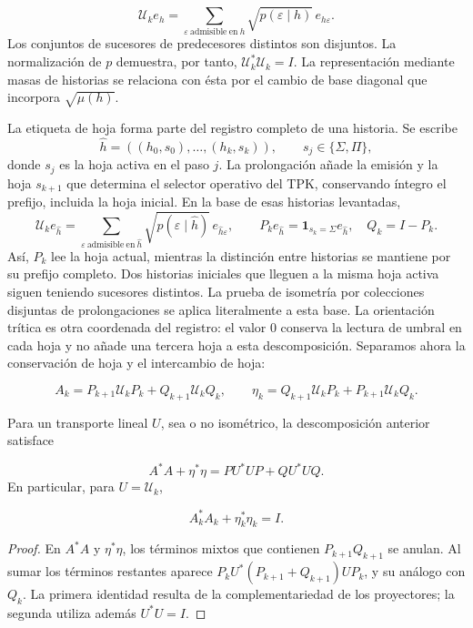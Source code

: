 \[
\mathcal U_ke_h=
\sum_{\varepsilon\ \mathrm{admisible\ en}\ h}
\sqrt{p(\varepsilon\mid h)}\,e_{h\varepsilon}.
\]
Los conjuntos de sucesores de predecesores distintos son disjuntos. La normalización de \(p\) demuestra, por tanto, \(\mathcal U_k^*\mathcal U_k=I\). La representación mediante masas de historias se relaciona con ésta por el cambio de base diagonal que incorpora \(\sqrt{\mu(h)}\).

La etiqueta de hoja forma parte del registro completo de una historia. Se escribe
\[
\widehat h=((h_0,s_0),\ldots,(h_k,s_k)),\qquad
s_j\in\{\Sigma,\Pi\},
\]
donde \(s_j\) es la hoja activa en el paso \(j\). La prolongación añade la emisión y la hoja \(s_{k+1}\) que determina el selector operativo del TPK, conservando íntegro el prefijo, incluida la hoja inicial. En la base de esas historias levantadas,
\[
\mathcal U_ke_{\widehat h}
=\sum_{\varepsilon\ \mathrm{admisible\ en}\ \widehat h}
\sqrt{p(\varepsilon\mid\widehat h)}\,e_{\widehat h\varepsilon},
\qquad
P_ke_{\widehat h}=\mathbf1_{s_k=\Sigma}e_{\widehat h},\quad
Q_k=I-P_k.
\]
Así, \(P_k\) lee la hoja actual, mientras la distinción entre historias se mantiene por su prefijo completo. Dos historias iniciales que lleguen a la misma hoja activa siguen teniendo sucesores distintos. La prueba de isometría por colecciones disjuntas de prolongaciones se aplica literalmente a esta base.
La orientación trítica es otra coordenada del registro: el valor \(0\) conserva la lectura de umbral en cada hoja y no añade una tercera hoja a esta descomposición. Separamos ahora la conservación de hoja y el intercambio de hoja:

\[
A_k=P_{k+1}\mathcal U_kP_k+Q_{k+1}\mathcal U_kQ_k,
\qquad
\eta_k=Q_{k+1}\mathcal U_kP_k+P_{k+1}\mathcal U_kQ_k.
\]
\begin{proposition}
\label{iv:cont:gram}
Para un transporte lineal \(U\), sea o no isométrico, la descomposición anterior satisface

\[
A^*A+\eta^*\eta=PU^*UP+QU^*UQ.
\]
En particular, para \(U=\mathcal U_k\),

\[
A_k^*A_k+\eta_k^*\eta_k=I.
\]
\end{proposition}
\begin{proof}
En \(A^*A\) y \(\eta^*\eta\), los términos mixtos que contienen \(P_{k+1}Q_{k+1}\) se anulan. Al sumar los términos restantes aparece \(P_kU^*(P_{k+1}+Q_{k+1})UP_k\), y su análogo con \(Q_k\). La primera identidad resulta de la complementariedad de los proyectores; la segunda utiliza además \(U^*U=I\).
\end{proof}

